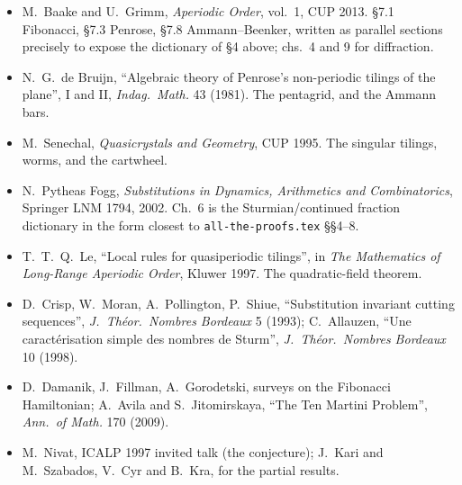 \documentclass[11pt,a4paper]{article}
\theoremstyle{definition}
\theoremstyle{plain}
\begin{document}
\begin{itemize}\itemsep2pt
\item M.~Baake and U.~Grimm, \emph{Aperiodic Order}, vol.~1, CUP 2013. \S7.1
  Fibonacci, \S7.3 Penrose, \S7.8 Ammann--Beenker, written as parallel sections
  precisely to expose the dictionary of \S4 above; chs.~4 and 9 for diffraction.
\item N.~G.~de Bruijn, ``Algebraic theory of Penrose's non-periodic tilings of
  the plane'', I and II, \emph{Indag.\ Math.} 43 (1981). The pentagrid, and the
  Ammann bars.
\item M.~Senechal, \emph{Quasicrystals and Geometry}, CUP 1995. The singular
  tilings, worms, and the cartwheel.
\item N.~Pytheas Fogg, \emph{Substitutions in Dynamics, Arithmetics and
  Combinatorics}, Springer LNM 1794, 2002. Ch.~6 is the Sturmian/continued
  fraction dictionary in the form closest to \texttt{all-the-proofs.tex}
  \S\S4--8.
\item T.~T.~Q.~Le, ``Local rules for quasiperiodic tilings'', in
  \emph{The Mathematics of Long-Range Aperiodic Order}, Kluwer 1997. The
  quadratic-field theorem.
\item D.~Crisp, W.~Moran, A.~Pollington, P.~Shiue, ``Substitution invariant
  cutting sequences'', \emph{J.\ Th\'eor.\ Nombres Bordeaux} 5 (1993);
  C.~Allauzen, ``Une caract\'erisation simple des nombres de Sturm'',
  \emph{J.\ Th\'eor.\ Nombres Bordeaux} 10 (1998).
\item D.~Damanik, J.~Fillman, A.~Gorodetski, surveys on the Fibonacci
  Hamiltonian; A.~Avila and S.~Jitomirskaya, ``The Ten Martini Problem'',
  \emph{Ann.\ of Math.} 170 (2009).
\item M.~Nivat, ICALP 1997 invited talk (the conjecture); J.~Kari and
  M.~Szabados, V.~Cyr and B.~Kra, for the partial results.
\end{itemize}
\end{document}
